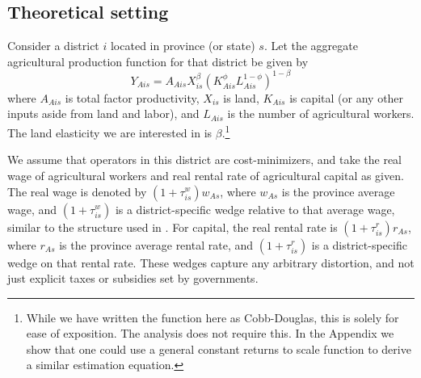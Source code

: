 \documentclass[11pt]{article}
\begin{document}
\subsection{Theoretical setting}
Consider a district $i$ located in province (or state) $s$. Let the aggregate agricultural production function for that district be given by
\begin{equation}
Y_{Ais} = A_{Ais} X_{is}^{\beta} \left(K_{Ais}^{\phi}L_{Ais}^{1-\phi}\right)^{1-\beta} \label{EQ_production}
\end{equation}
where $A_{Ais}$ is total factor productivity, $X_{is}$ is land, $K_{Ais}$ is capital (or any other inputs aside from land and labor), and $L_{Ais}$ is the number of agricultural workers. The land elasticity we are interested in is $\beta$.\footnote{While we have written the function here as Cobb-Douglas, this is solely for ease of exposition. The analysis does not require this. In the Appendix we show that one could use a general constant returns to scale function to derive a similar estimation equation.}

We assume that operators in this district are cost-minimizers, and take the real wage of agricultural workers and real rental rate of agricultural capital as given. The real wage is denoted by $(1+\tau^w_{is})w_{As}$, where $w_{As}$ is the province average wage, and $(1+\tau^w_{is})$ is a district-specific wedge relative to that average wage, similar to the structure used in \cite{hsieh2009misallocation}. For capital, the real rental rate is $(1+\tau^r_{is})r_{As}$, where $r_{As}$ is the province average rental rate, and $(1+\tau^r_{is})$ is a district-specific wedge on that rental rate. These wedges capture any arbitrary distortion, and not just explicit taxes or subsidies set by governments.
\end{document}
